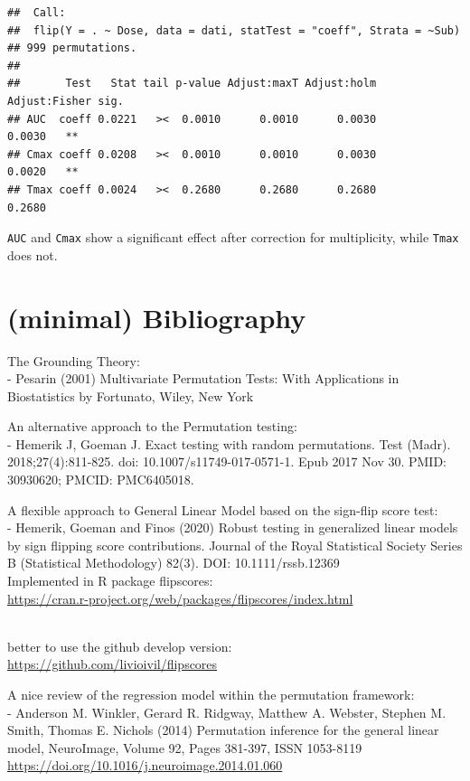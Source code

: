 \documentclass[
]{article}
\begin{document}
\begin{verbatim}
##  Call:
##  flip(Y = . ~ Dose, data = dati, statTest = "coeff", Strata = ~Sub) 
## 999 permutations.
## 
##       Test   Stat tail p-value Adjust:maxT Adjust:holm Adjust:Fisher sig.
## AUC  coeff 0.0221   ><  0.0010      0.0010      0.0030        0.0030   **
## Cmax coeff 0.0208   ><  0.0010      0.0010      0.0030        0.0020   **
## Tmax coeff 0.0024   ><  0.2680      0.2680      0.2680        0.2680
\end{verbatim}

\texttt{AUC} and \texttt{Cmax} show a significant effect after
correction for multiplicity, while \texttt{Tmax} does not.

\hypertarget{minimal-bibliography}{%
\section{(minimal) Bibliography}\label{minimal-bibliography}}

The Grounding Theory:\\
- Pesarin (2001) Multivariate Permutation Tests: With Applications in
Biostatistics by Fortunato, Wiley, New York

An alternative approach to the Permutation testing:\\
- Hemerik J, Goeman J. Exact testing with random permutations. Test
(Madr). 2018;27(4):811-825. doi: 10.1007/s11749-017-0571-1. Epub 2017
Nov 30. PMID: 30930620; PMCID: PMC6405018.

A flexible approach to General Linear Model based on the sign-flip score
test:\\
- Hemerik, Goeman and Finos (2020) Robust testing in generalized linear
models by sign flipping score contributions. Journal of the Royal
Statistical Society Series B (Statistical Methodology) 82(3). DOI:
10.1111/rssb.12369\\
Implemented in R package flipscores:\\
\url{https://cran.r-project.org/web/packages/flipscores/index.html}\strut \\
better to use the github develop version:\\
\url{https://github.com/livioivil/flipscores}

A nice review of the regression model within the permutation
framework:\\
- Anderson M. Winkler, Gerard R. Ridgway, Matthew A. Webster, Stephen M.
Smith, Thomas E. Nichols (2014) Permutation inference for the general
linear model, NeuroImage, Volume 92, Pages 381-397, ISSN 1053-8119
\url{https://doi.org/10.1016/j.neuroimage.2014.01.060}
\end{document}
